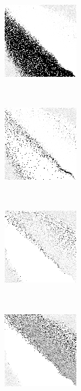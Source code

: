 
\begin{figure}
\center

	\begin{subfigure}[t]{0.22\textwidth}
		\includegraphics[width=\stratgraphwidth]{images/findings/round2/strats/winner/hand_max_min.png}
		\caption{\handmaxmin}
	\end{subfigure}
	~
	\begin{subfigure}[t]{0.22\textwidth}
		\includegraphics[width=\stratgraphwidth]{images/findings/round2/strats/winner/hand_max_avg.png}
		\caption{\handmaxavg}
	\end{subfigure}
	~
	\begin{subfigure}[t]{0.22\textwidth}
		\includegraphics[width=\stratgraphwidth]{images/findings/round2/strats/winner/hand_max_med.png}
		\caption{\handmaxmed}
	\end{subfigure}
	~
	\begin{subfigure}[t]{0.22\textwidth}
		\includegraphics[width=\stratgraphwidth]{images/findings/round2/strats/winner/hand_max_poss.png}
		\caption{\handmaxposs}
	\end{subfigure}


\end{figure}
